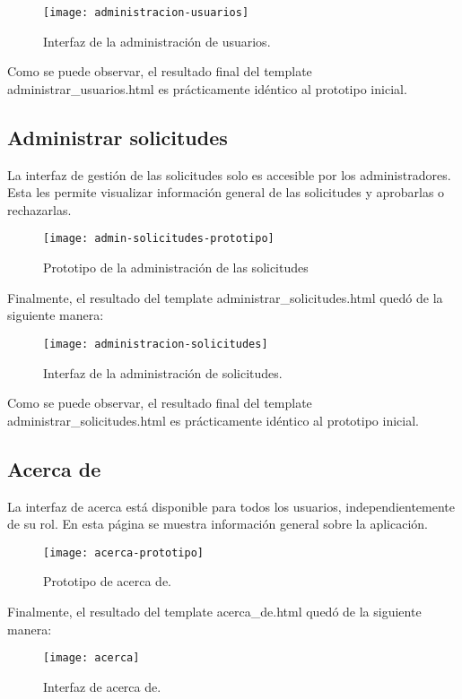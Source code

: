 \begin{figure}[htb]
\centering
\texttt{[image: administracion-usuarios]}
\caption{Interfaz de la administración de usuarios.}
\label{fig:administracion-usuarios}
\end{figure}

Como se puede observar, el resultado final del template administrar\_usuarios.html es prácticamente idéntico al prototipo inicial. 

\subsection{Administrar solicitudes}
La interfaz de gestión de las solicitudes solo es accesible por los administradores. Esta les permite visualizar información general de las solicitudes y aprobarlas o rechazarlas.

\begin{figure}[htb]
\centering
\texttt{[image: admin-solicitudes-prototipo]}
\caption{Prototipo de la administración de las solicitudes}
\label{fig:admin-solicitudes-prototipo}
\end{figure}
Finalmente, el resultado del template administrar\_solicitudes.html quedó de la siguiente manera:

\begin{figure}[htb]
\centering
\texttt{[image: administracion-solicitudes]}
\caption{Interfaz de la administración de solicitudes.}
\label{fig:administracion-solicitudes}
\end{figure}

Como se puede observar, el resultado final del template administrar\_solicitudes.html es prácticamente idéntico al prototipo inicial. 

\subsection{Acerca de}
La interfaz de acerca está disponible para todos los usuarios, independientemente de su rol. En esta página se muestra información general sobre la aplicación.

\begin{figure}[htb]
\centering
\texttt{[image: acerca-prototipo]}
\caption{Prototipo de acerca de.}
\label{fig:acerca-prototipo}
\end{figure}
Finalmente, el resultado del template acerca\_de.html quedó de la siguiente manera:

\begin{figure}[htb]
\centering
\texttt{[image: acerca]}
\caption{Interfaz de acerca de.}
\label{fig:acerca}
\end{figure}

